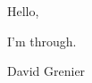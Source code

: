 \documentclass{amsart}
\begin{document}
Hello,

\vfill I'm through.

\vfill David Grenier
\end{document}
